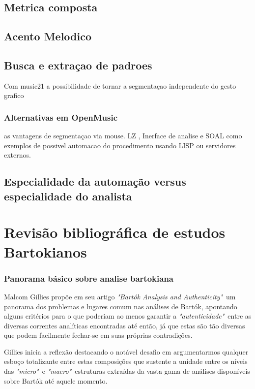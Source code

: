 \documentclass[
	12pt,				%
	openright,			%
	twoside,			%
	a4paper,			%
	english,			%
	french,				%
	spanish,			%
	brazil				%
	]{abntex2}
\begin{document}
\section{Metrica composta}

\section{Acento Melodico}

\section{Busca e extraçao de padroes}

Com music21 a possibilidade de tornar a segmentaçao independente do gesto grafico

\subsection{Alternativas em OpenMusic}

as vantagens de segmentaçao via mouse. LZ , Inerface de analise e SOAL como exemplos de possivel automacao do procedimento usando LISP ou servidores externos.

\section{Especialidade da automação versus especialidade do analista}

\chapter{Revisão bibliográfica de estudos Bartokianos}

\subsection{Panorama básico sobre analise bartokiana}

Malcom Gillies propõe em seu artigo \textit{"Bartók Analysis and Authenticity"}\cite{gillies1995bartok}\ um panorama dos problemas e lugares comum nas análises de Bartók, apontando alguns critérios para o que poderiam ao menos garantir a \textit{"autenticidade"}\ entre as diversas correntes analíticas encontradas até então, já que estas são tão diversas que podem facilmente fechar-se em suas próprias contradições. 

Gillies inicia a reflexão destacando o notável desafio em argumentarmos qualquer esboço totalizante entre estas composições que sustente a unidade entre os níveis das \textit{ "micro"}\ e \textit{"macro"}\ estruturas extraídas da vasta gama de análises disponíveis sobre Bartók até aquele momento.
\end{document}
